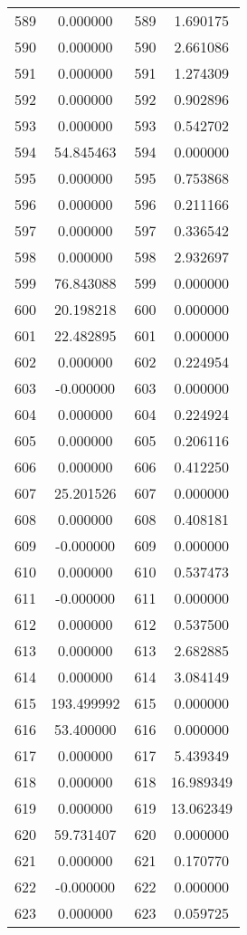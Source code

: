 \documentclass[12pt]{article}
\begin{document}
\begin{longtable}{@{}cccc@{}}
589 & 0.000000 & 589 & 1.690175 \\
590 & 0.000000 & 590 & 2.661086 \\
591 & 0.000000 & 591 & 1.274309 \\
592 & 0.000000 & 592 & 0.902896 \\
593 & 0.000000 & 593 & 0.542702 \\
594 & 54.845463 & 594 & 0.000000 \\
595 & 0.000000 & 595 & 0.753868 \\
596 & 0.000000 & 596 & 0.211166 \\
597 & 0.000000 & 597 & 0.336542 \\
598 & 0.000000 & 598 & 2.932697 \\
599 & 76.843088 & 599 & 0.000000 \\
600 & 20.198218 & 600 & 0.000000 \\
601 & 22.482895 & 601 & 0.000000 \\
602 & 0.000000 & 602 & 0.224954 \\
603 & -0.000000 & 603 & 0.000000 \\
604 & 0.000000 & 604 & 0.224924 \\
605 & 0.000000 & 605 & 0.206116 \\
606 & 0.000000 & 606 & 0.412250 \\
607 & 25.201526 & 607 & 0.000000 \\
608 & 0.000000 & 608 & 0.408181 \\
609 & -0.000000 & 609 & 0.000000 \\
610 & 0.000000 & 610 & 0.537473 \\
611 & -0.000000 & 611 & 0.000000 \\
612 & 0.000000 & 612 & 0.537500 \\
613 & 0.000000 & 613 & 2.682885 \\
614 & 0.000000 & 614 & 3.084149 \\
615 & 193.499992 & 615 & 0.000000 \\
616 & 53.400000 & 616 & 0.000000 \\
617 & 0.000000 & 617 & 5.439349 \\
618 & 0.000000 & 618 & 16.989349 \\
619 & 0.000000 & 619 & 13.062349 \\
620 & 59.731407 & 620 & 0.000000 \\
621 & 0.000000 & 621 & 0.170770 \\
622 & -0.000000 & 622 & 0.000000 \\
623 & 0.000000 & 623 & 0.059725 \\

\end{longtable}
\end{document}
